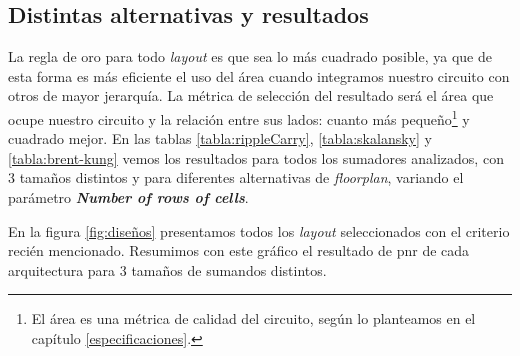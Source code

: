\subsection{Distintas alternativas y resultados}
La regla de oro para todo \emph{layout} es que sea lo más cuadrado posible, ya que de esta forma es más eficiente el uso del área cuando integramos nuestro circuito con otros de mayor jerarquía. La métrica de selección del resultado será el área que ocupe nuestro circuito y la relación entre sus lados: cuanto más pequeño\footnote{El área es una métrica de calidad del circuito, según lo planteamos en el capítulo \ref{especificaciones}.} y cuadrado mejor. En las tablas \ref{tabla:rippleCarry}, \ref{tabla:skalansky} y \ref{tabla:brent-kung} vemos los resultados para todos los sumadores analizados, con 3 tamaños distintos y para diferentes alternativas de \emph{floorplan}, variando el parámetro \textbf{\emph{Number of rows of cells}}.

En la figura \ref{fig:diseños} presentamos todos los \emph{layout} seleccionados con el criterio recién mencionado. Resumimos con este gráfico el resultado de \gls{pnr} de cada arquitectura para 3 tamaños de sumandos distintos.
\begin{table}[h]
\centering
{}
\caption{Ubicación y conexionado para Ripple carry en 3 tamaños: 8, 16 y 32 bits}
\label{tabla:rippleCarry}
\end{table}

